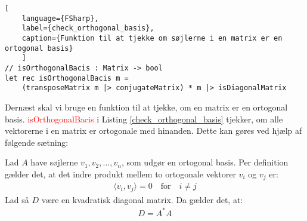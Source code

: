 \begin{lstlisting}[
    language={FSharp}, 
    label={check_orthogonal_basis}, 
    caption={Funktion til at tjekke om søjlerne i en matrix er en ortogonal basis}
    ]
// isOrthogonalBacis : Matrix -> bool
let rec isOrthogonalBacis m =
    (transposeMatrix m |> conjugateMatrix) * m |> isDiagonalMatrix
\end{lstlisting}



Dernæst skal vi bruge en funktion til at tjekke, om en matrix er en ortogonal basis. \textcolor{red}{isOrthogonalBacis} i Listing \ref{check_orthogonal_basis} tjekker, om alle vektorerne i en matrix er ortogonale med hinanden. Dette kan gøres ved hjælp af følgende sætning:

\vspace{0.5cm}
\begin{theorem}
    Lad \( A \) have søjlerne \( v_1, v_2, \ldots, v_n \), som udgør en ortogonal basis. Per definition gælder det, at det indre produkt mellem to ortogonale vektorer \( v_i \) og \( v_j \) er:
    \begin{gather}
        \langle v_i, v_j \rangle = 0 \quad \text{for} \quad i \neq j
    \end{gather}
    Lad så \( D \) være en kvadratisk diagonal matrix. Da gælder det, at:
    \begin{gather}
        D = A^* A
    \end{gather}
\end{theorem}

